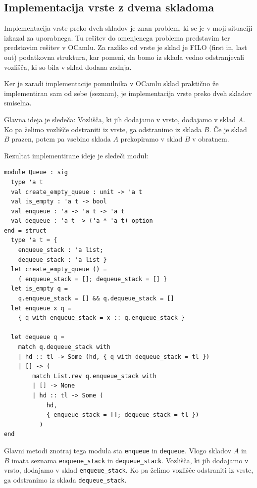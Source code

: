 \documentclass[mat1, tisk]{fmfdelo}
\begin{document}
\subsection{Implementacija vrste z dvema skladoma}

Implementacija vrste preko dveh skladov je znan problem, ki se je v moji situaciji izkazal za uporabnega.
Tu rešitev do omenjenega problema predstavim ter predstavim rešitev v OCamlu.
Za razliko od vrste je sklad je FILO (first in, last out) podatkovna struktura, kar pomeni, da bomo iz sklada vedno
odstranjevali vozlišča, ki so bila v sklad dodana zadnja.

Ker je zaradi implementacije pomnilnika v OCamlu sklad praktično že implementiran sam od sebe (seznam), je implementacija
vrste preko dveh skladov smiselna.

Glavna ideja je sledeča: Vozlišča, ki jih dodajamo v vrsto, dodajamo v sklad $A$. Ko pa želimo vozlišče odstraniti iz
vrste, ga odstranimo iz sklada $B$. Če je sklad $B$ prazen, potem pa vsebino sklada $A$ prekopiramo v sklad $B$ v obratnem.

Rezultat implementirane ideje je sledeči modul:

\begin{lstlisting}[label=lst:queue]
module Queue : sig
  type 'a t
  val create_empty_queue : unit -> 'a t
  val is_empty : 'a t -> bool
  val enqueue : 'a -> 'a t -> 'a t
  val dequeue : 'a t -> ('a * 'a t) option
end = struct
  type 'a t = { 
    enqueue_stack : 'a list; 
    dequeue_stack : 'a list }
  let create_empty_queue () = 
    { enqueue_stack = []; dequeue_stack = [] }
  let is_empty q = 
    q.enqueue_stack = [] && q.dequeue_stack = []
  let enqueue x q = 
    { q with enqueue_stack = x :: q.enqueue_stack }

  let dequeue q =
    match q.dequeue_stack with
    | hd :: tl -> Some (hd, { q with dequeue_stack = tl })
    | [] -> (
        match List.rev q.enqueue_stack with
        | [] -> None
        | hd :: tl -> Some (
            hd, 
            { enqueue_stack = []; dequeue_stack = tl })
          )
end
\end{lstlisting}

Glavni metodi znotraj tega modula sta \texttt{enqueue} in \texttt{dequeue}. Vlogo skladov $A$ in $B$ imata
seznama \texttt{enqueue\_stack} in \texttt{dequeue\_stack}. Vozlišča, ki jih dodajamo v vrsto, dodajamo v sklad
\texttt{enqueue\_stack}. Ko pa želimo vozlišče odstraniti iz vrste, ga odstranimo iz sklada \texttt{dequeue\_stack}.
\end{document}
